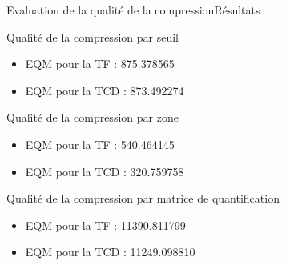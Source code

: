 \begin{frame}{Evaluation de la qualité de la compression}{Résultats}
  \begin{block}{Qualité de la compression par seuil}
    \begin{itemize}
      \item EQM pour la TF : 875.378565 
      \item EQM pour la TCD : 873.492274 
    \end{itemize}  
  \end{block}
  \begin{block}{ Qualité de la compression par zone}
    \begin{itemize}
      \item EQM pour la TF : 540.464145 
      \item EQM pour la TCD : 320.759758
    \end{itemize}  
  \end{block}
  \begin{block}{Qualité de la compression par matrice de quantification}
    \begin{itemize}
      \item EQM pour la TF : 11390.811799 
      \item EQM pour la TCD : 11249.098810 
    \end{itemize}  
  \end{block}
\end{frame}